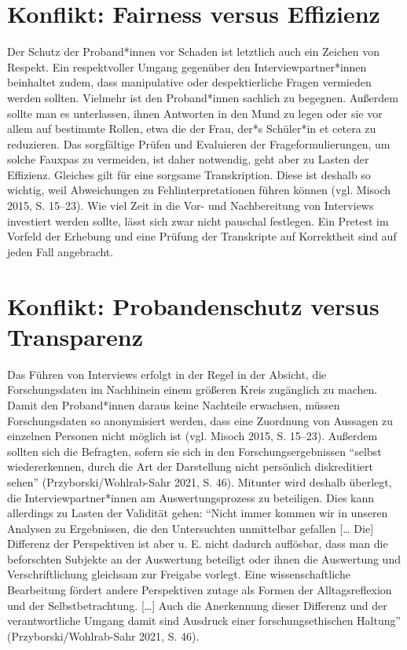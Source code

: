 \documentclass[a4paper,
fontsize=11pt,
oneside,
numbers=noperiodatend,
parskip=half-,
bibliography=totoc,
final
]{scrartcl}
\begin{document}
\section{Konflikt: Fairness versus
Effizienz}\label{konflikt-fairness-versus-effizienz}

Der Schutz der Proband*innen vor Schaden ist letztlich auch ein Zeichen
von Respekt. Ein respektvoller Umgang gegenüber den
Interviewpartner*innen beinhaltet zudem, dass manipulative oder
despektierliche Fragen vermieden werden sollten. Vielmehr ist den
Proband*innen sachlich zu begegnen. Außerdem sollte man es unterlassen,
ihnen Antworten in den Mund zu legen oder sie vor allem auf bestimmte
Rollen, etwa die der Frau, der*s Schüler*in et cetera zu reduzieren. Das
sorgfältige Prüfen und Evaluieren der Frageformulierungen, um solche
Fauxpas zu vermeiden, ist daher notwendig, geht aber zu Lasten der
Effizienz. Gleiches gilt für eine sorgsame Transkription. Diese ist
deshalb so wichtig, weil Abweichungen zu Fehlinterpretationen führen
können (vgl. Misoch 2015, S. 15--23). Wie viel Zeit in die Vor- und
Nachbereitung von Interviews investiert werden sollte, lässt sich zwar
nicht pauschal festlegen. Ein Pretest im Vorfeld der Erhebung und eine
Prüfung der Transkripte auf Korrektheit sind auf jeden Fall angebracht.

\section{Konflikt: Probandenschutz versus
Transparenz}\label{konflikt-probandenschutz-versus-transparenz}

Das Führen von Interviews erfolgt in der Regel in der Absicht, die
Forschungsdaten im Nachhinein einem größeren Kreis zugänglich zu machen.
Damit den Proband*innen daraus keine Nachteile erwachsen, müssen
Forschungsdaten so anonymisiert werden, dass eine Zuordnung von Aussagen
zu einzelnen Personen nicht möglich ist (vgl. Misoch 2015, S. 15--23).
Außerdem sollten sich die Befragten, sofern sie sich in den
Forschungsergebnissen \enquote{selbst wiedererkennen, durch die Art der
Darstellung nicht persönlich diskreditiert sehen}
(Przyborski/Wohlrab-Sahr 2021, S. 46). Mitunter wird deshalb überlegt,
die Interviewpartner*innen am Auswertungsprozess zu beteiligen. Dies
kann allerdings zu Lasten der Validität gehen: \enquote{Nicht immer
kommen wir in unseren Analysen zu Ergebnissen, die den Untersuchten
unmittelbar gefallen {[}\ldots{} Die{]} Differenz der Perspektiven ist
aber u. E. nicht dadurch auflösbar, dass man die beforschten Subjekte an
der Auswertung beteiligt oder ihnen die Auswertung und Verschriftlichung
gleichsam zur Freigabe vorlegt. Eine wissenschaftliche Bearbeitung
fördert andere Perspektiven zutage als Formen der Alltagsreflexion und
der Selbstbetrachtung. {[}\ldots{]} Auch die Anerkennung dieser
Differenz und der verantwortliche Umgang damit sind Ausdruck einer
forschungsethischen Haltung} (Przyborski/Wohlrab-Sahr 2021, S. 46).
\end{document}
